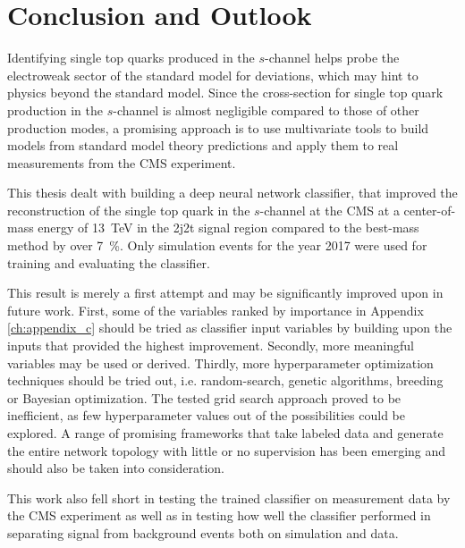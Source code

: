 \chapter{Conclusion and Outlook}
Identifying single top quarks produced in the $s$-channel helps probe the electroweak sector of the standard model for deviations, which may hint to physics beyond the standard model. Since the cross-section for single top quark production in the $s$-channel is almost negligible compared to those of other production modes, a promising approach is to use multivariate tools to build models from standard model theory predictions and apply them to real measurements from the CMS experiment.

This thesis dealt with building a deep neural network classifier, that improved the reconstruction of the single top quark in the $s$-channel at the CMS at a center-of-mass energy of \SI{13}{TeV} in the 2j2t signal region compared to the best-mass method by over \SI{7}{\%}. Only simulation events for the year 2017 were used for training and evaluating the classifier.

This result is merely a first attempt and may be significantly improved upon in future work. First, some of the variables ranked by importance in Appendix \ref{ch:appendix_c} should be tried as classifier input variables by building upon the inputs that provided the highest improvement. Secondly, more meaningful variables may be used or derived. Thirdly, more hyperparameter optimization techniques should be tried out, i.e. random-search, genetic algorithms, breeding or Bayesian optimization. The tested grid search approach proved to be inefficient, as few hyperparameter values out of the possibilities could be explored. A range of promising frameworks that take labeled data and generate the entire network topology with little or no supervision has been emerging and should also be taken into consideration.

This work also fell short in testing the trained classifier on measurement data by the CMS experiment as well as in testing how well the classifier performed in separating signal from background events both on simulation and data.